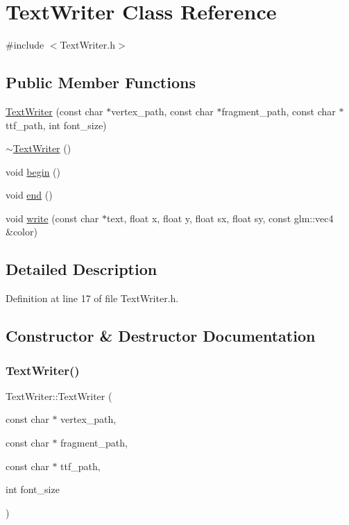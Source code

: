 \hypertarget{class_text_writer}{}\section{Text\+Writer Class Reference}
\label{class_text_writer}


{\ttfamily \#include $<$Text\+Writer.\+h$>$}

\subsection*{Public Member Functions}
\begin{DoxyCompactItemize}
\item 
\hyperlink{class_text_writer_aa1b80a78641197e5ec41a5a8b29f9101}{Text\+Writer} (const char $\ast$vertex\+\_\+path, const char $\ast$fragment\+\_\+path, const char $\ast$ttf\+\_\+path, int font\+\_\+size)
\item 
\hyperlink{class_text_writer_aab0c50e9ffcd9fe2797753b222ad1641}{$\sim$\+Text\+Writer} ()
\item 
void \hyperlink{class_text_writer_aa120043668d4eba84d41222c0dbd3b86}{begin} ()
\item 
void \hyperlink{class_text_writer_a725e9275d2826c823947e790611ad9ca}{end} ()
\item 
void \hyperlink{class_text_writer_a26b8bbd68df18171d18eafd7ebaab8e3}{write} (const char $\ast$text, float x, float y, float sx, float sy, const glm\+::vec4 \&color)
\end{DoxyCompactItemize}


\subsection{Detailed Description}


Definition at line 17 of file Text\+Writer.\+h.



\subsection{Constructor \& Destructor Documentation}
\mbox{\label{class_text_writer_aa1b80a78641197e5ec41a5a8b29f9101}} 
\subsubsection{\texorpdfstring{Text\+Writer()}{TextWriter()}}
{\footnotesize\ttfamily Text\+Writer\+::\+Text\+Writer (\begin{DoxyParamCaption}\item[{const char $\ast$}]{vertex\+\_\+path,  }\item[{const char $\ast$}]{fragment\+\_\+path,  }\item[{const char $\ast$}]{ttf\+\_\+path,  }\item[{int}]{font\+\_\+size }\end{DoxyParamCaption})}



